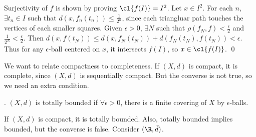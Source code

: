 Surjectivity of \(f\) is shown by proving \(\cl{f(I)} = I^2\). Let \(x \in I^2\). For each \(n\), \(\exists t_n \in I\) such that \(d(x, f_n(t_n)) \leq \frac{1}{2^n}\), since each triangluar path touches the vertices of each smaller squares. Given \(\epsilon > 0\), \(\exists N\) such that \(\rho(f_N, f) < \frac{\epsilon}{2}\) and \(\frac{1}{2^N} < \frac{\epsilon}{2}\). Then \(d(x, f(t_N)) \leq d(x, f_N(t_N)) + d(f_N(t_N), f(t_N)) < \epsilon\). Thus for any \(\epsilon\)-ball centered on \(x\), it intersects \(f(I)\), so \(x \in \cl{f(I)}\). \qed


We want to relate compactness to completeness. If \((X, d)\) is compact, it is complete, since \((X, d)\) is sequentially compact. But the converse is not true, so we need an extra condition.

.  \((X, d)\) is totally bounded if \(\forall \epsilon > 0\), there is a finite covering of \(X\) by \(\epsilon\)-balls.

\rmk If \((X, d)\) is compact, it is totally bounded. Also, totally bounded implies bounded, but the converse is false. Consider \((\R, \bar{d})\).

\pagebreak
